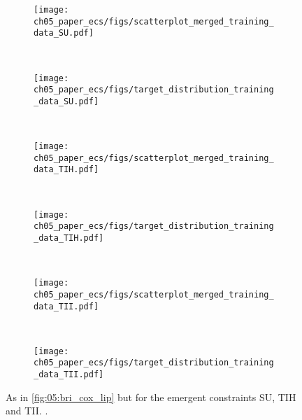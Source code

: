 \begin{figure}[p]
  \centering
  \begin{subfigure}[b]{\SubfigureWidth{}}
    \texttt{[image: 
      ch05\_paper\_ecs/figs/scatterplot\_merged\_training\_data\_SU.pdf]}
    \caption{}
    \label{fig:05:su_tih_tii:a}
  \end{subfigure}
  ~
  \begin{subfigure}[b]{\SubfigureWidth{}}
    \texttt{[image: 
      ch05\_paper\_ecs/figs/target\_distribution\_training\_data\_SU.pdf]}
    \caption{}
    \label{fig:05:su_tih_tii:b}
  \end{subfigure}
  \\
  \begin{subfigure}[b]{\SubfigureWidth{}}
    \texttt{[image: 
      ch05\_paper\_ecs/figs/scatterplot\_merged\_training\_data\_TIH.pdf]}
    \caption{}
    \label{fig:05:su_tih_tii:c}
  \end{subfigure}
  ~
  \begin{subfigure}[b]{\SubfigureWidth{}}
    \texttt{[image: 
      ch05\_paper\_ecs/figs/target\_distribution\_training\_data\_TIH.pdf]}
    \caption{}
    \label{fig:05:su_tih_tii:d}
  \end{subfigure}
  \\
  \begin{subfigure}[b]{\SubfigureWidth{}}
    \texttt{[image: 
      ch05\_paper\_ecs/figs/scatterplot\_merged\_training\_data\_TII.pdf]}
    \caption{}
    \label{fig:05:su_tih_tii:e}
  \end{subfigure}
  ~
  \begin{subfigure}[b]{\SubfigureWidth{}}
    \texttt{[image: 
      ch05\_paper\_ecs/figs/target\_distribution\_training\_data\_TII.pdf]}
    \caption{}
    \label{fig:05:su_tih_tii:f}
  \end{subfigure}
  \caption{As in \cref{fig:05:bri_cox_lip} but for the emergent constraints
    SU, TIH and TII. .}
  \label{fig:05:su_tih_tii}
\end{figure}

